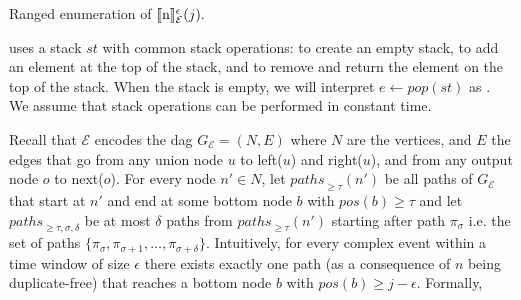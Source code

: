 \begin{algorithm}[H]
  \LinesNumbered
  \DontPrintSemicolon
  \SetAlgoNoEnd %
  \SetAlgoNoLine %
\caption{Ranged enumeration of $\llbracket \text{n} \rrbracket^{\epsilon}_{\mathcal{E}}(j).$}
\label{algo:enumeration}
\end{algorithm}

 uses a stack $st$ with common stack operations:  to create an empty stack,  to add an element  at the top of the stack, and  to remove and return the element on the top of the stack. When the stack is empty, we will interpret $e \leftarrow pop(st)$ as . We assume that stack operations can be performed in constant time.

Recall that $\mathcal{E}$ encodes the \acrshort{dag} $G_{\mathcal{E}} = (N, E)$ where $N$ are the vertices, and $E$ the edges that go from any union node $u$ to left($u$) and right($u$), and from any output node $o$ to next($o$). For every node $n' \in N$, let ${paths}_{\ge \tau}(n')$ be all paths of $G_{\mathcal{E}}$ that start at $n'$ and end at some bottom node $b$ with $pos(b) \ge \tau$ and let ${paths}_{\ge \tau, \sigma, \delta}$ be at most $\delta$ paths from ${paths}_{\ge \tau}(n')$ starting after path $\pi_{\sigma}$ i.e. the set of paths $\{ \pi_{\sigma}, \pi_{\sigma+1}, \ldots, \pi_{\sigma+\delta}\}$. Intuitively, for every complex event within a time window of size $\epsilon$ there exists exactly one path (as a consequence of $n$ being duplicate-free) that reaches a bottom node $b$ with $pos(b) \ge j - \epsilon$. Formally,


